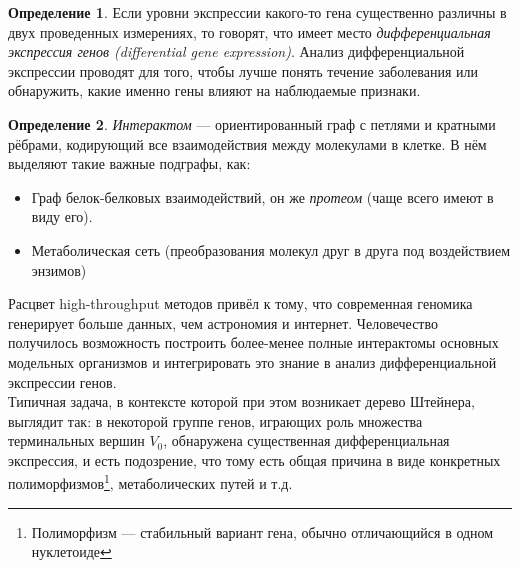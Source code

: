 \documentclass[11pt,a4paper]{report}
\theoremstyle{definition}
\theoremstyle{definition}
\theoremstyle{definition}
\newtheorem{definition}{Определение}[section]
\begin{document}
	\begin{definition}
		Если уровни экспрессии какого-то гена существенно различны в двух проведенных измерениях, то говорят, что имеет место \textit{дифференциальная экспрессия генов (differential gene expression)}. Анализ дифференциальной экспрессии проводят для того, чтобы лучше понять течение заболевания или обнаружить, какие именно гены влияют на наблюдаемые признаки.
	\end{definition}
	\begin{definition}
		\textit{Интерактом} — ориентированный граф с петлями и кратными рёбрами, кодирующий все взаимодействия между молекулами в клетке. В нём выделяют такие важные подграфы, как:
		\begin{itemize}
			\item Граф белок-белковых взаимодействий, он же \textit{протеом} (чаще всего имеют в виду его).
			\item Метаболическая сеть (преобразования молекул друг в друга под воздействием энзимов)
		\end{itemize}
	\end{definition}
	\noindent Расцвет high-throughput методов привёл к тому, что современная геномика генерирует больше данных, чем астрономия и интернет. Человечество получилось возможность построить более-менее полные интерактомы основных модельных организмов и интегрировать это знание в анализ дифференциальной экспрессии генов.\\
	
	\noindent Типичная задача, в контексте которой при этом возникает дерево Штейнера, выглядит так: в некоторой группе генов, играющих роль множества терминальных вершин $V_0$, обнаружена существенная дифференциальная экспрессия, и есть подозрение, что тому есть общая причина в виде конкретных полиморфизмов\footnote{Полиморфизм — стабильный вариант гена, обычно отличающийся в одном нуклетоиде}, метаболических путей и т.д.\\
	
\end{document}

